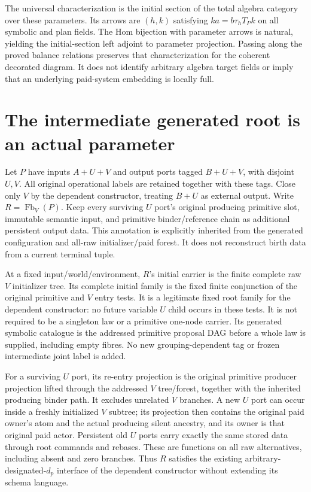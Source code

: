 \documentclass[11pt]{article}
\begin{document}
The universal characterization is the initial section of the total algebra category over these parameters. Its arrows are $(h,k)$ satisfying $ka=b\tau_hT_Pk$ on all symbolic and plan fields. The Hom bijection with parameter arrows is natural, yielding the initial-section left adjoint to parameter projection. Passing along the proved balance relations preserves that characterization for the coherent decorated diagram. It does not identify arbitrary algebra target fields or imply that an underlying paid-system embedding is locally full.

\section{The intermediate generated root is an actual parameter}
Let $P$ have inputs $A+U+V$ and output ports tagged $B+U+V$, with disjoint $U,V$. All original operational labels are retained together with these tags. Close only $V$ by the dependent constructor, treating $B+U$ as external output. Write $R=\operatorname{Fb}_V(P)$. Keep every surviving $U$ port's original producing primitive slot, immutable semantic input, and primitive binder/reference chain as additional persistent output data. This annotation is explicitly inherited from the generated configuration and all-raw initializer/paid forest. It does not reconstruct birth data from a current terminal tuple.

At a fixed input/world/environment, $R$'s initial carrier is the finite complete raw $V$ initializer tree. Its complete initial family is the fixed finite conjunction of the original primitive and $V$ entry tests. It is a legitimate fixed root family for the dependent constructor: no future variable $U$ child occurs in these tests. It is not required to be a singleton law or a primitive one-node carrier. Its generated symbolic catalogue is the addressed primitive proposal DAG before a whole law is supplied, including empty fibres. No new grouping-dependent tag or frozen intermediate joint label is added.

For a surviving $U$ port, its re-entry projection is the original primitive producer projection lifted through the addressed $V$ tree/forest, together with the inherited producing binder path. It excludes unrelated $V$ branches. A new $U$ port can occur inside a freshly initialized $V$ subtree; its projection then contains the original paid owner's atom and the actual producing silent ancestry, and its owner is that original paid actor. Persistent old $U$ ports carry exactly the same stored data through root commands and rebases. These are functions on all raw alternatives, including absent and zero branches. Thus $R$ satisfies the existing arbitrary-designated-$d_p$ interface of the dependent constructor without extending its schema language.
\end{document}
